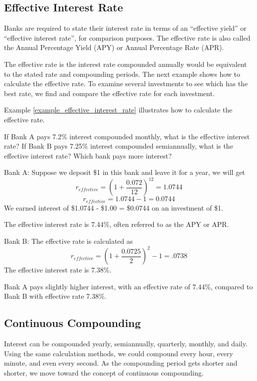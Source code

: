 \subsection{Effective Interest Rate}
Banks are required to state their interest rate in terms of an “effective yield” or “effective interest rate”, for comparison purposes. The effective rate is also called the Annual Percentage Yield (APY) or Annual Percentage Rate (APR).

The effective rate is the interest rate compounded annually would be equivalent to the stated rate and compounding periods. The next example shows how to calculate the effective rate. To examine several investments to see which has the best rate, we find and compare the effective rate for each investment.

Example \ref{example_effective_interest_rate} illustrates how to calculate the effective rate.

\begin{example} \label{example_effective_interest_rate}
    If Bank A pays 7.2\% interest compounded monthly, what is the effective interest rate? If Bank B pays 7.25\% interest compounded semiannually, what is the effective interest rate? Which bank pays more interest?
\end{example}
\begin{solution}
    Bank A: Suppose we deposit \$1 in this bank and leave it for a year, we will get
    \[
        r_{effective} = \left(1 + \frac{0.072}{12}\right)^{12} = 1.0744
    \]
    \[
        r_{effective} = 1.0744 - 1 = 0.0744
    \]
    We earned interest of \$1.0744 - \$1.00 = \$0.0744 on an investment of \$1.

    The effective interest rate is 7.44\%, often referred to as the APY or APR.

    Bank B: The effective rate is calculated as
    \[
        r_{effective} = \left(1 + \frac{0.0725}{2}\right)^{2} - 1 = .0738
    \]
    The effective interest rate is 7.38\%.

    Bank A pays slightly higher interest, with an effective rate of 7.44\%, compared to Bank B with effective rate 7.38\%.
\end{solution}


\subsection{Continuous Compounding}

Interest can be compounded yearly, semiannually, quarterly, monthly, and daily. Using the same calculation methods, we could compound every hour, every minute, and even every second. As the compounding period gets shorter and shorter, we move toward the concept of continuous compounding.

